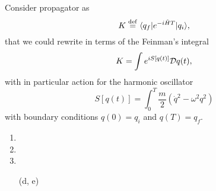 Consider propagator as 
\begin{equation*}
	K \overset{\mathrm{def}}{=}  \bk{q_f}[e^{-i \hat{H} T}]{q_i},
\end{equation*}
that we could rewrite in terms of the Feinman's integral
\begin{equation*}
	K = \int e^{i S[q(t)]} \mathcal{D} q(t),
\end{equation*}
with in particular action for the harmonic oscillator
\begin{equation}
	S[q(t)] = \int_{0}^{T} \frac{m}{2} \left(
		\dot{q}^2 - \omega^2 q^2
	\right)
	\label{S}
\end{equation}
with boundary conditions $q(0) = q_i$ and $q(T) = q_f$. 

\begin{enumerate}[label=(\alph*)]
    
    \item 
    \item 
    \item 
    \item[(d, e)] 

\end{enumerate}




